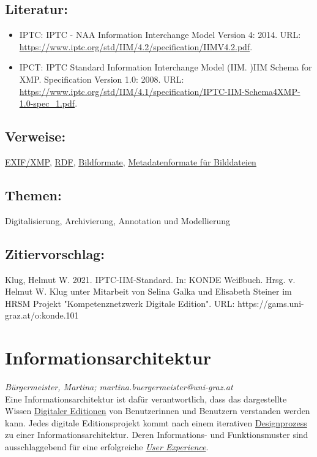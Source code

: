 \documentclass{article}
\begin{document}
        \subsection*{Literatur:}\begin{itemize}\item IPTC: IPTC - NAA Information Interchange Model Version 4: 2014. URL: \url{https://www.iptc.org/std/IIM/4.2/specification/IIMV4.2.pdf}.\item IPCT: IPTC Standard Information Interchange Model (IIM. )IIM Schema for XMP. Specification Version 1.0: 2008. URL: \url{https://www.iptc.org/std/IIM/4.1/specification/IPTC-IIM-Schema4XMP-1.0-spec_1.pdf}.\end{itemize}\subsection*{Verweise:}\href{https://gams.uni-graz.at/o:konde.81}{EXIF/XMP}, \href{https://gams.uni-graz.at/o:konde.131}{RDF}, \href{https://gams.uni-graz.at/o:konde.122}{Bildformate}, \href{https://gams.uni-graz.at/o:konde.124}{Metadatenformate für Bilddateien}\subsection*{Themen:}Digitalisierung, Archivierung, Annotation und Modellierung\subsection*{Zitiervorschlag:}Klug, Helmut W. 2021. IPTC-IIM-Standard. In: KONDE Weißbuch. Hrsg. v. Helmut W. Klug unter Mitarbeit von Selina Galka und Elisabeth Steiner im HRSM Projekt "Kompetenznetzwerk Digitale Edition". URL: https://gams.uni-graz.at/o:konde.101\newpage\section*{Informationsarchitektur} \emph{Bürgermeister, Martina; martina.buergermeister@uni-graz.at }\\
        
    Eine Informationsarchitektur ist dafür verantwortlich, dass das dargestellte
                  Wissen \href{http://gams.uni-graz.at/o:konde.59}{Digitaler Editionen} von
                  Benutzerinnen und Benutzern verstanden werden kann. Jedes digitale Editionsprojekt
                  kommt nach einem iterativen \href{http://gams.uni-graz.at/o:konde.56}{Designprozess} zu einer Informationsarchitektur. Deren Informations- und
                  Funktionsmuster sind ausschlaggebend für eine erfolgreiche \emph{\href{http://gams.uni-graz.at/o:konde.207}{User Experience}}.\\
            
\end{document}
